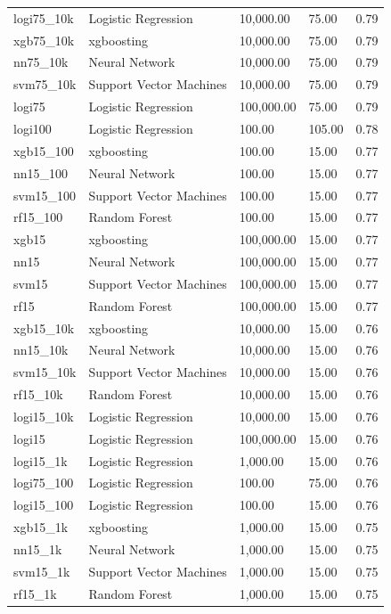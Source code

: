 \documentclass[
  man]{apa7}
\begin{document}
\begin{center}
\begin{ThreePartTable}
\begin{longtable}{lllll}
logi75\_10k & Logistic Regression & 10,000.00 & 75.00 & 0.79\\
xgb75\_10k & xgboosting & 10,000.00 & 75.00 & 0.79\\
nn75\_10k & Neural Network & 10,000.00 & 75.00 & 0.79\\
svm75\_10k & Support Vector Machines & 10,000.00 & 75.00 & 0.79\\
logi75 & Logistic Regression & 100,000.00 & 75.00 & 0.79\\
logi100 & Logistic Regression & 100.00 & 105.00 & 0.78\\
xgb15\_100 & xgboosting & 100.00 & 15.00 & 0.77\\
nn15\_100 & Neural Network & 100.00 & 15.00 & 0.77\\
svm15\_100 & Support Vector Machines & 100.00 & 15.00 & 0.77\\
rf15\_100 & Random Forest & 100.00 & 15.00 & 0.77\\
xgb15 & xgboosting & 100,000.00 & 15.00 & 0.77\\
nn15 & Neural Network & 100,000.00 & 15.00 & 0.77\\
svm15 & Support Vector Machines & 100,000.00 & 15.00 & 0.77\\
rf15 & Random Forest & 100,000.00 & 15.00 & 0.77\\
xgb15\_10k & xgboosting & 10,000.00 & 15.00 & 0.76\\
nn15\_10k & Neural Network & 10,000.00 & 15.00 & 0.76\\
svm15\_10k & Support Vector Machines & 10,000.00 & 15.00 & 0.76\\
rf15\_10k & Random Forest & 10,000.00 & 15.00 & 0.76\\
logi15\_10k & Logistic Regression & 10,000.00 & 15.00 & 0.76\\
logi15 & Logistic Regression & 100,000.00 & 15.00 & 0.76\\
logi15\_1k & Logistic Regression & 1,000.00 & 15.00 & 0.76\\
logi75\_100 & Logistic Regression & 100.00 & 75.00 & 0.76\\
logi15\_100 & Logistic Regression & 100.00 & 15.00 & 0.76\\
xgb15\_1k & xgboosting & 1,000.00 & 15.00 & 0.75\\
nn15\_1k & Neural Network & 1,000.00 & 15.00 & 0.75\\
svm15\_1k & Support Vector Machines & 1,000.00 & 15.00 & 0.75\\
rf15\_1k & Random Forest & 1,000.00 & 15.00 & 0.75\\

\end{longtable}
\end{ThreePartTable}
\end{center}
\end{document}

